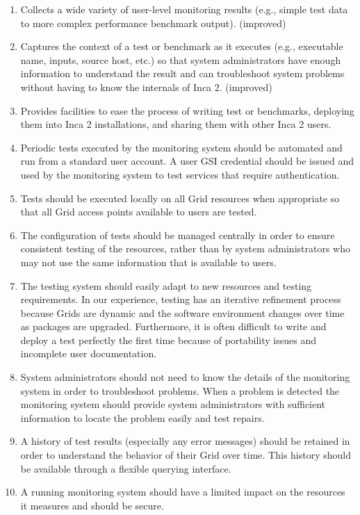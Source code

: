 \documentclass[times,10pt,twocolumn]{article}
\begin{document}
\begin{enumerate}

\item Collects a wide variety of user-level monitoring results (e.g., simple
test data to more complex performance benchmark output).  (improved) 

\item Captures the context of a test or benchmark as it executes (e.g.,
executable name, inputs, source host, etc.) so that system administrators have
enough information to understand the result and can troubleshoot system
problems without having to know the internals of Inca 2. (improved)

\item Provides facilities to ease the process of writing test or benchmarks,
deploying them into Inca 2 installations, and sharing them with other Inca 2
users.  

\item Periodic tests executed by the monitoring system should be automated and
run from a standard user account.  A user GSI credential should be issued and
used by the monitoring system to test services that require authentication.  
\item Tests should be executed locally on all Grid resources when appropriate so
that all Grid access points available to users are tested.  
\item The configuration of tests should be managed centrally in order to ensure
consistent testing of the resources, rather than by system administrators who
may not use the same information that is available to users.
\item The testing system should easily adapt to new resources and testing
requirements.  In our experience, testing has an iterative refinement process
because Grids are dynamic and the software environment changes over time as
packages are upgraded.  Furthermore, it is often difficult to write and deploy
a test perfectly the first time because of portability issues and incomplete
user documentation.   
\item System administrators should not need to know the details of the
monitoring system in order to troubleshoot problems.  When a problem is
detected the monitoring system should provide system administrators with
sufficient information to locate the problem easily and test repairs.
\item A history of test results (especially any error messages) should be
retained in order to understand the behavior of their Grid over time. This
history should be available through a flexible querying interface.
\item A running monitoring system should have a limited impact on the resources
it measures and should be secure.
\end{enumerate}
\end{document}
